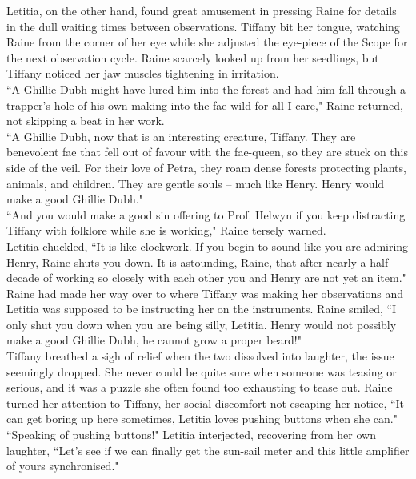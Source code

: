 Letitia, on the other hand, found great amusement in pressing Raine for details in the dull waiting times between observations.
Tiffany bit her tongue, watching Raine from the corner of her eye while she adjusted the eye-piece of the Scope for the next observation cycle. Raine scarcely looked up from her seedlings, but Tiffany noticed her jaw muscles tightening in irritation.\\

``A Ghillie Dubh might have lured him into the forest and had him fall through a trapper's hole of his own making into the fae-wild for all I care," Raine returned, not skipping a beat in her work.\\
``A Ghillie Dubh, now that is an interesting creature, Tiffany. They are benevolent fae that fell out of favour with the fae-queen, so they are stuck on this side of the veil. For their love of Petra, they roam dense forests protecting plants, animals, and children. They are gentle souls -- much like Henry. Henry would make a good Ghillie Dubh."\\
``And you would make a good sin offering to Prof. Helwyn if you keep distracting Tiffany with folklore while she is working," Raine tersely warned.\\

Letitia chuckled, ``It is like clockwork. If you begin to sound like you are admiring Henry, Raine shuts you down. It is astounding, Raine, that after nearly a half-decade of working so closely with each other you and Henry are not yet an item."\\
Raine had made her way over to where Tiffany was making her observations and Letitia was supposed to be instructing her on the instruments. Raine smiled, ``I only shut you down when you are being silly, Letitia. Henry would not possibly make a good Ghillie Dubh, he cannot grow a proper beard!"\\

Tiffany breathed a sigh of relief when the two dissolved into laughter, the issue seemingly dropped. She never could be quite sure when someone was teasing or serious, and it was a puzzle she often found too exhausting to tease out. Raine turned her attention to Tiffany, her social discomfort not escaping her notice, ``It can get boring up here sometimes, Letitia loves pushing buttons when she can."\\

``Speaking of pushing buttons!" Letitia interjected, recovering from her own laughter, ``Let's see if we can finally get the sun-sail meter and this little amplifier of yours synchronised."


